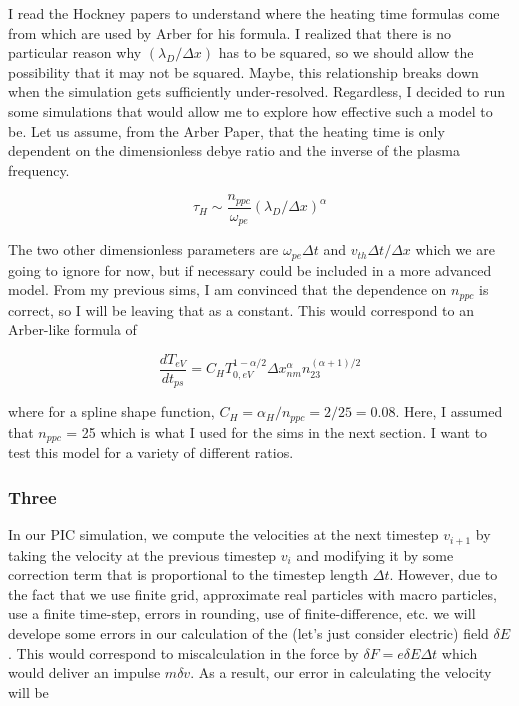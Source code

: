 I read the Hockney papers to understand where the heating time formulas come from which are used by Arber for his formula. I realized that there is no particular reason why $(\lambda_D / \Delta x)$ has to be squared, so we should allow the possibility that it may not be squared. Maybe, this relationship breaks down when the simulation gets sufficiently under-resolved. Regardless, I decided to run some simulations that would allow me to explore how effective such a model to be. Let us assume, from the Arber Paper, that the heating time is only dependent on the dimensionless debye ratio and the inverse of the plasma frequency.

\begin{equation} 
	\tau_H \sim \frac{n_{ppc}}{\omega_{pe}} ( \lambda_D / \Delta x)^\alpha
\end{equation}

The two other dimensionless parameters are $\omega_{pe} \Delta t$ and $v_{th} \Delta t / \Delta x$ which we are going to ignore for now, but if necessary could be included in a more advanced model. From my previous sims, I am convinced that the dependence on $n_{ppc}$ is correct, so I will be leaving that as a constant. This would correspond to an Arber-like formula of 

\begin{equation}
	\frac{dT_{eV}}{dt_{ps}} = C_H T_{0,eV}^{1 - \alpha/2} \Delta x_{nm}^\alpha n_{23}^{(\alpha + 1)/2}
\end{equation}

where for a spline shape function, $C_H = \alpha_{H} / n_{ppc} = 2/25 = 0.08$. Here, I assumed that $n_{ppc}$ = 25 which is what I used for the sims in the next section. I want to test this model for a variety of different ratios. 

\subsubsection{Three}

In our PIC simulation, we compute the velocities at the next timestep $v_{i+1}$ by taking the velocity at the previous timestep $v_i$ and modifying it by some correction term that is proportional to the timestep length $\Delta t$. However, due to the fact that we use finite grid, approximate real particles with macro particles, use a finite time-step, errors in rounding, use of finite-difference, etc. we will develope some errors in our calculation of the (let's just consider electric) field $\delta E$. This would correspond to miscalculation in the force by $\delta F = e \delta E \Delta t$ which would deliver an impulse $m \delta v$. As a result, our error in calculating the velocity will be 

